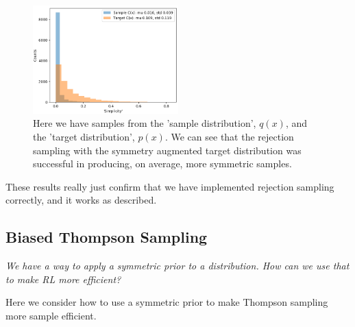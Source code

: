 \begin{figure}[h!]
  \centering
  \includegraphics[width=0.5\textwidth,height=0.25\textheight]{../../pictures/figures/s2-prior-rejection-8d.png}
  \caption{Here we have samples from the 'sample distribution', $q(x)$, and the 'target distribution', $p(x)$.
	We can see that the rejection sampling with the symmetry augmented target distribution was successful in producing, on average, more symmetric samples. }
\end{figure}

These results really just confirm that we have implemented
rejection sampling correctly, and it works as described.


%
%

\newpage
\subsection{Biased Thompson Sampling} \label{thompson-sampling}

\begin{displayquote}
\textsl{We have a way to apply a symmetric prior to a distribution.
How can we use that to make RL more efficient?}
\end{displayquote}

Here we consider how to use a symmetric prior to make Thompson sampling more sample efficient\footnotemark.

